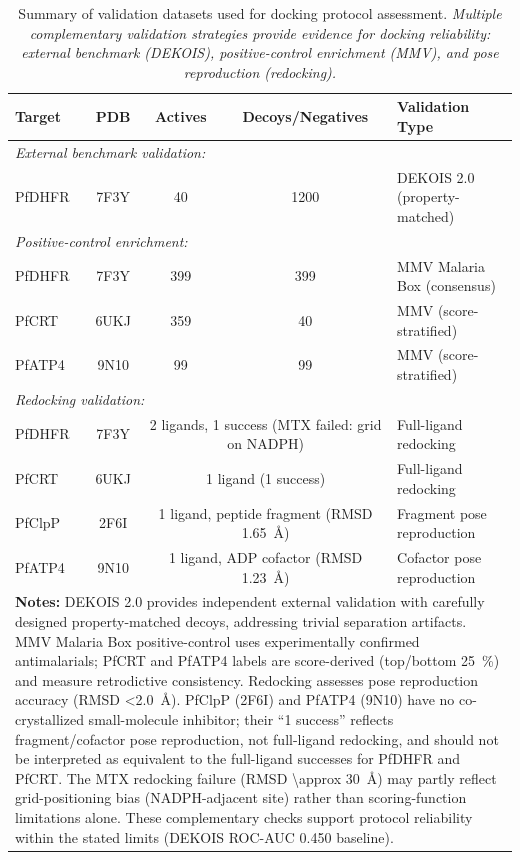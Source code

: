 
\begin{table}[ht!]
\centering
\caption{Summary of validation datasets used for docking protocol assessment. \textit{Multiple complementary validation strategies provide evidence for docking reliability: external benchmark (DEKOIS), positive-control enrichment (MMV), and pose reproduction (redocking).}}
\label{tab:sm_validation_datasets}
\small
\begin{tabular}{lcccp{5cm}}
\toprule
\textbf{Target} & \textbf{PDB} & \textbf{Actives} & \textbf{Decoys/Negatives} & \textbf{Validation Type} \\
\midrule
\multicolumn{5}{l}{\textit{External benchmark validation:}} \\
PfDHFR & 7F3Y & \num{40} & \num{1200} & DEKOIS 2.0 (property-matched) \\
\midrule
\multicolumn{5}{l}{\textit{Positive-control enrichment:}} \\
PfDHFR & 7F3Y & \num{399} & \num{399} & MMV Malaria Box (consensus) \\
PfCRT & 6UKJ & \num{359} & \num{40} & MMV (score-stratified) \\
PfATP4 & 9N10 & \num{99} & \num{99} & MMV (score-stratified) \\
\midrule
\multicolumn{5}{l}{\textit{Redocking validation:}} \\
PfDHFR & 7F3Y & \multicolumn{2}{c}{\num{2} ligands, \num{1} success (MTX failed: grid on NADPH)} & Full-ligand redocking \\
PfCRT & 6UKJ & \multicolumn{2}{c}{\num{1} ligand (\num{1} success)} & Full-ligand redocking \\
PfClpP & 2F6I & \multicolumn{2}{c}{1 ligand, peptide fragment (RMSD \qty{1.65}{\angstrom})} & Fragment pose reproduction \\
PfATP4 & 9N10 & \multicolumn{2}{c}{1 ligand, ADP cofactor (RMSD \qty{1.23}{\angstrom})} & Cofactor pose reproduction \\
\bottomrule
\multicolumn{5}{p{14cm}}{
\noindent\textbf{Notes:} DEKOIS 2.0 provides independent external validation with carefully designed property-matched decoys, addressing trivial separation artifacts. MMV Malaria Box positive-control uses experimentally confirmed antimalarials; PfCRT and PfATP4 labels are score-derived (top/bottom \qty{25}{\percent}) and measure retrodictive consistency. Redocking assesses pose reproduction accuracy (RMSD \qty{<2.0}{\angstrom}). PfClpP (2F6I) and PfATP4 (9N10) have no co-crystallized small-molecule inhibitor; their ``1 success'' reflects fragment/cofactor pose reproduction, not full-ligand redocking, and should not be interpreted as equivalent to the full-ligand successes for PfDHFR and PfCRT. The MTX redocking failure (RMSD \qty{\approx 30}{\angstrom}) may partly reflect grid-positioning bias (NADPH-adjacent site) rather than scoring-function limitations alone. These complementary checks support protocol reliability within the stated limits (DEKOIS ROC-AUC \num{0.450} baseline).}
\end{tabular}
\end{table}

